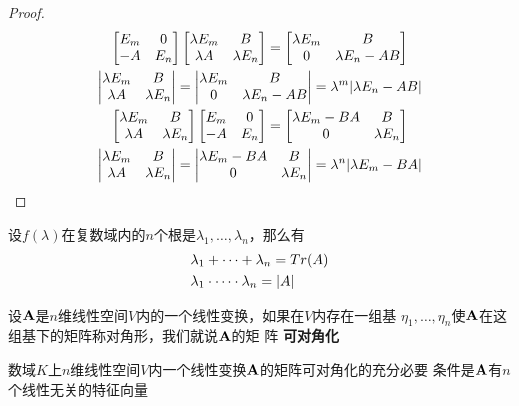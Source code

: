 \documentclass[11pt]{article}
\begin{document}
\begin{proof}
\begin{gather*}
\begin{bmatrix}
E_m&0\\-A&E_n
\end{bmatrix}
\begin{bmatrix}
\lambda E_m&B\\\lambda A&\lambda E_n
\end{bmatrix}=
\begin{bmatrix}
\lambda E_m&B\\0&\lambda E_n-AB
\end{bmatrix}\\
\begin{vmatrix}
\lambda E_m&B\\\lambda A&\lambda E_n
\end{vmatrix}=
\begin{vmatrix}
\lambda E_m&B\\0&\lambda E_n-AB
\end{vmatrix}=
\lambda^m\abs{\lambda E_n-AB}\\
\begin{bmatrix}
\lambda E_m&B\\\lambda A&\lambda E_n
\end{bmatrix}
\begin{bmatrix}
E_m&0\\-A&E_n
\end{bmatrix}=
\begin{bmatrix}
\lambda E_m-BA&B\\0&\lambda E_n
\end{bmatrix}\\
\begin{vmatrix}
\lambda E_m&B\\\lambda A&\lambda E_n
\end{vmatrix}=
\begin{vmatrix}
\lambda E_m-BA&B\\0&\lambda E_n
\end{vmatrix}=
\lambda^n\abs{\lambda E_m-BA}
\end{gather*}
\end{proof}

设\(f(\lambda)\)在复数域内的\(n\)个根是\(\lambda_1,\dots,\lambda_n\)，那么有
\begin{align*}
&\lambda_1+\dots+\lambda_n=Tr(A)\\
&\lambda_1\cdot\dots\cdot\lambda_n=\abs{A}
\end{align*}

设\(\operatorname{\textbf{A}}\)是\(n\)维线性空间\(V\)内的一个线性变换，如果在\(V\)内存在一组基
\(\eta_1,\dots,\eta_n\)使\(\operatorname{\textbf{A}}\)在这组基下的矩阵称对角形，我们就说\(\operatorname{\textbf{A}}\)的矩
阵 \textbf{可对角化}
\begin{theorem}[]
数域\(K\)上\(n\)维线性空间\(V\)内一个线性变换\(\operatorname{\textbf{A}}\)的矩阵可对角化的充分必要
条件是\(\operatorname{\textbf{A}}\)有\(n\)个线性无关的特征向量
\end{theorem}
\end{document}
